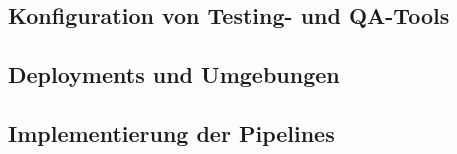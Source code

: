 \subsection{Konfiguration von Testing- und QA-Tools} \label{subsec:04-implementation-2}


\subsection{Deployments und Umgebungen} \label{subsec:04-implementation-3}


\subsection{Implementierung der Pipelines} \label{subsec:04-implementation-4}


\clearpage
